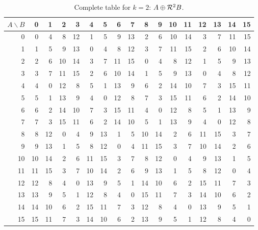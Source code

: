 \begin{table}[!htbp]\centering\small
\setlength{\tabcolsep}{5.0pt}\renewcommand{\arraystretch}{1.10}
\begin{tabular}{r|rrrrrrrrrrrrrrrr}\toprule
$A\backslash B$ & 0 & 1 & 2 & 3 & 4 & 5 & 6 & 7 & 8 & 9 & 10 & 11 & 12 & 13 & 14 & 15\\\midrule
0 & 0 & 4 & 8 & 12 & 1 & 5 & 9 & 13 & 2 & 6 & 10 & 14 & 3 & 7 & 11 & 15\\
1 & 1 & 5 & 9 & 13 & 0 & 4 & 8 & 12 & 3 & 7 & 11 & 15 & 2 & 6 & 10 & 14\\
2 & 2 & 6 & 10 & 14 & 3 & 7 & 11 & 15 & 0 & 4 & 8 & 12 & 1 & 5 & 9 & 13\\
3 & 3 & 7 & 11 & 15 & 2 & 6 & 10 & 14 & 1 & 5 & 9 & 13 & 0 & 4 & 8 & 12\\
4 & 4 & 0 & 12 & 8 & 5 & 1 & 13 & 9 & 6 & 2 & 14 & 10 & 7 & 3 & 15 & 11\\
5 & 5 & 1 & 13 & 9 & 4 & 0 & 12 & 8 & 7 & 3 & 15 & 11 & 6 & 2 & 14 & 10\\
6 & 6 & 2 & 14 & 10 & 7 & 3 & 15 & 11 & 4 & 0 & 12 & 8 & 5 & 1 & 13 & 9\\
7 & 7 & 3 & 15 & 11 & 6 & 2 & 14 & 10 & 5 & 1 & 13 & 9 & 4 & 0 & 12 & 8\\
8 & 8 & 12 & 0 & 4 & 9 & 13 & 1 & 5 & 10 & 14 & 2 & 6 & 11 & 15 & 3 & 7\\
9 & 9 & 13 & 1 & 5 & 8 & 12 & 0 & 4 & 11 & 15 & 3 & 7 & 10 & 14 & 2 & 6\\
10 & 10 & 14 & 2 & 6 & 11 & 15 & 3 & 7 & 8 & 12 & 0 & 4 & 9 & 13 & 1 & 5\\
11 & 11 & 15 & 3 & 7 & 10 & 14 & 2 & 6 & 9 & 13 & 1 & 5 & 8 & 12 & 0 & 4\\
12 & 12 & 8 & 4 & 0 & 13 & 9 & 5 & 1 & 14 & 10 & 6 & 2 & 15 & 11 & 7 & 3\\
13 & 13 & 9 & 5 & 1 & 12 & 8 & 4 & 0 & 15 & 11 & 7 & 3 & 14 & 10 & 6 & 2\\
14 & 14 & 10 & 6 & 2 & 15 & 11 & 7 & 3 & 12 & 8 & 4 & 0 & 13 & 9 & 5 & 1\\
15 & 15 & 11 & 7 & 3 & 14 & 10 & 6 & 2 & 13 & 9 & 5 & 1 & 12 & 8 & 4 & 0\\
\bottomrule\end{tabular}
\caption{Complete table for $k=2$: $A\oplus\mathcal R^2B$.}
\end{table}

